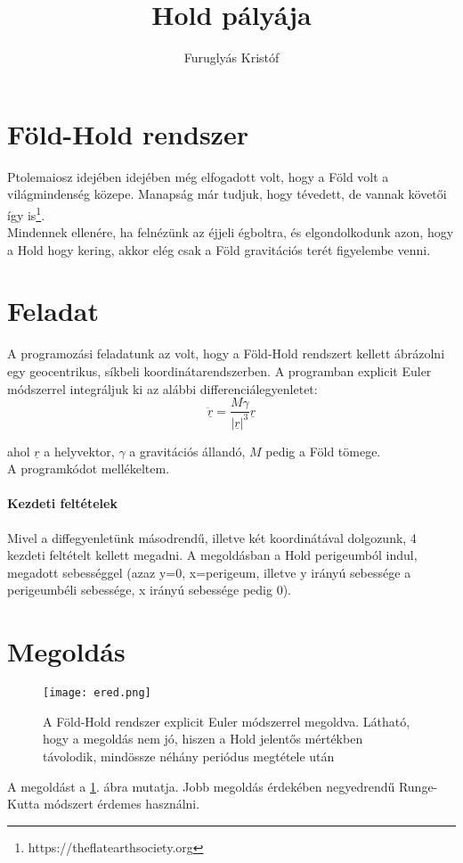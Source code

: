 \documentclass[]{article}
\title{Hold pályája}
\author{Furuglyás Kristóf}
\begin{document}
\maketitle
\newpage

\section{Föld-Hold rendszer}

Ptolemaiosz idejében idejében még elfogadott volt, hogy a Föld volt a világmindenség közepe. Manapság már tudjuk, hogy tévedett, de vannak követői így is\footnote{https://theflatearthsociety.org}. \\
Mindennek ellenére, ha felnézünk az éjjeli égboltra, és elgondolkodunk azon, hogy a Hold hogy kering, akkor elég csak a Föld gravitációs terét figyelembe venni.  

\section{Feladat}

A programozási feladatunk az volt, hogy a Föld-Hold rendszert kellett ábrázolni egy geocentrikus, síkbeli koordinátarendszerben. A programban explicit Euler módszerrel integráljuk ki az alábbi differenciálegyenletet:\\
$$
\underline{\ddot{r}}=\frac{M \gamma }{|\underline{r}|^3} \underline{r}
$$

ahol $\underline{r}$ a helyvektor, $\gamma$ a gravitációs állandó, $M$ pedig a Föld tömege.\\
A programkódot mellékeltem.

\paragraph{Kezdeti feltételek} Mivel a diffegyenletünk másodrendű, illetve két koordinátával dolgozunk, 4 kezdeti feltételt kellett megadni. A megoldásban a Hold perigeumból indul, megadott sebességgel (azaz y=0, x=perigeum, illetve y irányú sebessége a perigeumbéli sebessége, x irányú sebessége pedig 0).

\section{Megoldás}

\begin{figure}
\centering
\texttt{[image: ered.png]}
\caption{A Föld-Hold rendszer explicit Euler módszerrel megoldva. Látható, hogy a megoldás nem jó, hiszen a Hold jelentős mértékben távolodik, mindössze néhány periódus megtétele után}
\label{fig:plot}
\end{figure}
A megoldást a \ref{fig:plot}. ábra mutatja. Jobb megoldás érdekében negyedrendű Runge-Kutta módszert érdemes használni.
\end{document}
